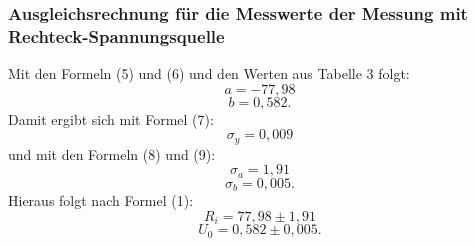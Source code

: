 \subsubsection{Ausgleichsrechnung für die Messwerte der Messung mit Rechteck-Spannungsquelle}
Mit den Formeln (5) und (6) und den Werten aus Tabelle 3 folgt:
\begin{displaymath}
a=-77,98
\end{displaymath}
\begin{displaymath}
b=0,582\text{.}
\end{displaymath}
Damit ergibt sich mit Formel (7):
\begin{displaymath}
\sigma_y=0,009
\end{displaymath}
und mit den Formeln (8) und (9):
\begin{displaymath}
\sigma_a=1,91
\end{displaymath}
\begin{displaymath}
\sigma_b=0,005\text{.}
\end{displaymath}
Hieraus folgt nach Formel (1):
\begin{displaymath}
R_i=77,98\pm 1,91
\end{displaymath}
\begin{displaymath}
U_0=0,582\pm 0,005\text{.}
\end{displaymath}

